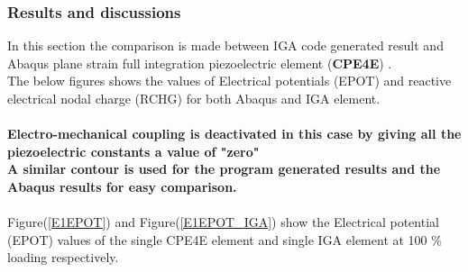 \documentclass[11pt]{article}
\begin{document}
\subsubsection{Results and discussions}
In this section the comparison is made between IGA code generated result and Abaqus plane strain full integration piezoelectric element (\textbf{CPE4E}) \cite{abaqus10version}.\\The below figures shows the values of Electrical potentials (EPOT) and reactive electrical nodal charge (RCHG) for both Abaqus and IGA element.\\
\\\textbf{Electro-mechanical coupling is deactivated in this case by giving all the piezoelectric constants a value of "zero"  }
\\
\textbf{A similar contour is used for the program generated results and the Abaqus results for easy comparison. }\\
\\
Figure(\ref{E1EPOT}) and Figure(\ref{E1EPOT_IGA}) show the Electrical potential (EPOT) values of the single CPE4E element and single IGA element at 100 \% loading respectively. \\
\end{document}
